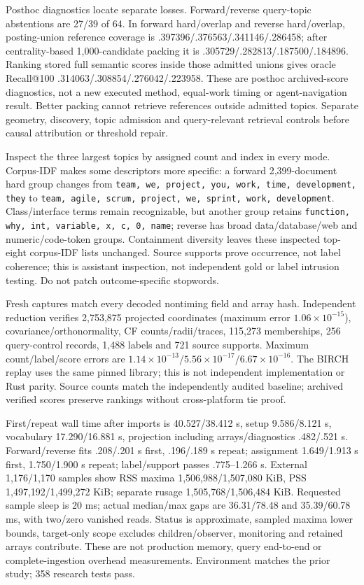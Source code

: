 \documentclass[11pt]{article}
\begin{document}
Posthoc diagnostics locate separate losses. Forward/reverse query-topic
abstentions are 27/39 of 64. In forward hard/overlap and reverse hard/overlap,
posting-union reference coverage is .397396/.376563/.341146/.286458;
after centrality-based 1,000-candidate packing it is
.305729/.282813/.187500/.184896. Ranking stored full semantic scores inside
those admitted unions gives oracle Recall@100 .314063/.308854/.276042/.223958.
These are posthoc archived-score diagnostics, not a new executed method,
equal-work timing or agent-navigation result. Better packing cannot retrieve
references outside admitted topics. Separate geometry, discovery, topic admission
and query-relevant retrieval controls before causal attribution or threshold repair.

Inspect the three largest topics by assigned count and index in every mode.
Corpus-IDF makes some descriptors more specific: a forward 2,399-document hard
group changes from \texttt{team, we, project, you, work, time, development, they}
to \texttt{team, agile, scrum, project, we, sprint, work, development}.
Class/interface terms remain recognizable, but another group retains
\texttt{function, why, int, variable, x, c, 0, name}; reverse has broad
data/database/web and numeric/code-token groups. Containment diversity leaves
these inspected top-eight corpus-IDF lists unchanged. Source supports prove
occurrence, not label coherence; this is assistant inspection, not independent
gold or label intrusion testing. Do not patch outcome-specific stopwords.

Fresh captures match every decoded nontiming field and array hash. Independent
reduction verifies 2,753,875 projected coordinates (maximum error
$1.06\times10^{-15}$), covariance/orthonormality, CF counts/radii/traces,
115,273 memberships, 256 query-control records, 1,488 labels and 721 source
supports. Maximum count/label/score errors are
$1.14\times10^{-13}$/$5.56\times10^{-17}$/$6.67\times10^{-16}$.
The BIRCH replay uses the same pinned library; this is not independent
implementation or Rust parity. Source counts match the independently audited
baseline; archived verified scores preserve rankings without cross-platform tie proof.

First/repeat wall time after imports is 40.527/38.412 s, setup 9.586/8.121 s,
vocabulary 17.290/16.881 s, projection including arrays/diagnostics .482/.521 s.
Forward/reverse fits .208/.201 s first, .196/.189 s repeat; assignment
1.649/1.913 s first, 1.750/1.900 s repeat; label/support passes .775--1.266 s.
External 1,176/1,170 samples show RSS maxima 1,506,988/1,507,080 KiB,
PSS 1,497,192/1,499,272 KiB; separate rusage 1,505,768/1,506,484 KiB.
Requested sample sleep is 20 ms; actual median/max gaps are 36.31/78.48 and
35.39/60.78 ms, with two/zero vanished reads.
Status is approximate, sampled maxima lower bounds, target-only scope excludes
children/observer, monitoring and retained arrays contribute. These are not
production memory, query end-to-end or complete-ingestion overhead measurements.
Environment matches the prior study; 358 research tests pass.
\end{document}
